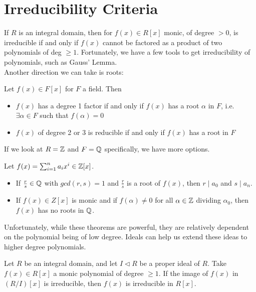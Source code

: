 \documentclass{memoir}
\begin{document}


\section{Irreducibility Criteria}
\label{sec:irreducibility_criteria}

If \(R\) is an integral domain, then for \(f(x) \in R[x]\) monic, of degree \(>0\), is irreducible if and only if \(f(x)\) cannot be factored as a product of two polynomials of deg \(\geq 1\).
Fortunately, we have a few tools to get irreducibility of polynomials, such as Gauss' Lemma.\\

Another direction we can take is roots:
\begin{prop}
	Let \(f(x) \in F[x]\) for \(F \) a field. Then
	\begin{itemize}
		\item \(f(x)\) has a degree 1 factor if and only if \(f(x)\) has a root \(\alpha\) in \(F\), i.e. \(\exists \alpha \in F\) such that \(f(\alpha)=0\) 
		\item \(f(x)\) of degree 2 or 3 is reducible if and only if \(f(x)\) has a root in \(F\)
	\end{itemize}
\end{prop}
If we look at \(R = \mathbb{Z}\) and \(F = \mathbb{Q}\) specifically, we have more options.
\begin{prop}
	Let \(f(x) = \sum_{i=1}^{n} a_i x^{i} \in \mathbb{Z}[x]\). 
\begin{itemize}
	\item If \(\frac{r}{s}\in \mathbb{Q}\) with \(gcd(r,s) = 1\) and \(\frac{r}{s}\) is a root of \(f(x)\), then \(r\mid a_0\) and \(s\mid a_n\).
	\item If \(f(x) \in Z[x]\) is monic and if \(f(\alpha)\neq 0\) for all \(\alpha \in \mathbb{Z}\) dividing \(\alpha_0\), then \(f(x)\) has no roots in \(\mathbb{Q}\).
\end{itemize}
\end{prop}
Unfortunately, while these theorems are powerful, they are relatively dependent on the polynomial being of low degree. Ideals can help us extend these ideas to higher degree polynomials.

\begin{prop}
	Let \(R\) be an integral domain, and let \(I \triangleleft R\) be a proper ideal of \(R\). Take \(f(x) \in R[x]\) a monic polynomial of degree \(\geq 1\). If the image of \(f(x)\) in \((R / I)[x]\) is irreducible, then \(f(x)\) is irreducible in \(R[x]\).
\end{prop}
\end{document}
